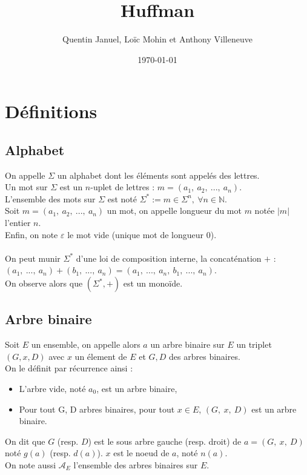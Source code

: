 \documentclass[a4paper, 12pt]{article}
\title{Huffman}
\author{Quentin Januel, Loïc Mohin et Anthony Villeneuve}
\date{\today}
\begin{document}
\maketitle
\newpage

\tableofcontents{}
\newpage

\section{Définitions}

\subsection{Alphabet}
On appelle $\Sigma$ un alphabet dont les éléments sont appelés des lettres. \\
Un mot sur $\Sigma$ est un $n$-uplet de lettres : $m = (a_1,\ a_2,\ ...,\ a_n)$. \\
L'ensemble des mots sur $\Sigma$ est noté $\Sigma^* := {m \in \Sigma^n,\ \forall n \in \mathbb{N}}$. \\
Soit $m = (a_1,\ a_2,\ ...,\ a_n)$ un mot, on appelle longueur du mot $m$ notée $|m|$ l'entier $n$. \\
Enfin, on note $\varepsilon$ le mot vide (unique mot de longueur $0$). \\ \\
On peut munir $\Sigma^*$ d'une loi de composition interne, la concaténation $+$ : \\
$(a_1,\ ...,\ a_n)+(b_1,\ ...,\ a_n) = (a_1,\ ...,\ a_n,\ b_1,\ ...,\ a_n)$. \\
On observe alors que $(\Sigma^*, +)$ est un monoïde.

\subsection{Arbre binaire}
Soit $E$ un ensemble, on appelle alors $a$ un arbre binaire sur $E$ un triplet $(G, x, D)$ avec $x$ un élement de $E$ et $G, D$ des arbres binaires. \\
On le définit par récurrence ainsi :
\begin{itemize}
\item L'arbre vide, noté $a_0$, est un arbre binaire,
\item Pour tout G, D arbres binaires, pour tout $x \in E$, $(G,\ x,\ D)$ est un arbre binaire.
\end{itemize}
On dit que $G$ (resp. $D$) est le sous arbre gauche (resp. droit) de $a = (G,\ x,\ D)$ noté $g(a)$ (resp. $d(a)$). $x$ est le noeud de $a$, noté $n(a)$. \\
On note aussi $\mathcal{A}_E$ l'ensemble des arbres binaires sur $E$.
\end{document}

